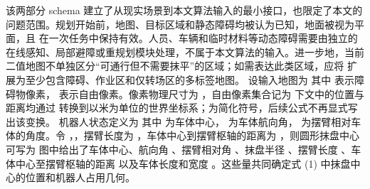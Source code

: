 {}该两部分 schema 建立了从现实场景到本文算法输入的最小接口，也限定了本文的问题范围。规划开始前，地图、目标区域和静态障碍均被认为已知，地面被视为平面，且  在一次任务中保持有效。人员、车辆和临时材料等动态障碍需要由独立的在线感知、局部避障或重规划模块处理，不属于本文算法的输入。进一步地，当前二值地图不单独区分“可通行但不需要抹平”的区域；如需表达此类区域，应将  扩展为至少包含障碍、作业区和仅转场区的多标签地图。\markdownRendererParagraphSeparator
{}
\markdownRendererSectionEnd \markdownRendererSectionBegin
{}\markdownRendererParagraphSeparator
{}设输入地图为\markdownRendererParagraphSeparator
{}\markdownRendererParagraphSeparator
{}其中  表示障碍物像素， 表示自由像素。像素物理尺寸为 ，自由像素集合记为\markdownRendererParagraphSeparator
{}\markdownRendererParagraphSeparator
{}下文中的位置与距离均通过  转换到以米为单位的世界坐标系；为简化符号，后续公式不再显式写出该变换。\markdownRendererParagraphSeparator
{}机器人状态定义为\markdownRendererParagraphSeparator
{}\markdownRendererParagraphSeparator
{}其中  为车体中心，\markdownRendererInlineMath{\theta} 为车体航向角，\markdownRendererInlineMath{\phi} 为摆臂相对车体的角度。令 ，，摆臂长度为 ，车体中心到摆臂枢轴的距离为 ，则圆形抹盘中心可写为\markdownRendererParagraphSeparator
{}\markdownRendererParagraphSeparator
{}\markdownRendererParagraphSeparator
{} 图中给出了车体中心、航向角 \markdownRendererInlineMath{\theta}、摆臂相对角 \markdownRendererInlineMath{\phi}、抹盘半径 、摆臂长度 、车体中心至摆臂枢轴的距离  以及车体长度和宽度 。这些量共同确定式 (1) 中抹盘中心的位置和机器人占用几何。\markdownRendererParagraphSeparator
